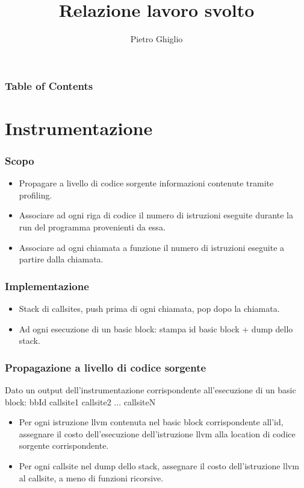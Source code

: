 \documentclass{beamer}
\title{Relazione lavoro svolto}
\author{Pietro Ghiglio}
\begin{document}
\titlepage

\begin{frame}
\frametitle{Table of Contents}
\tableofcontents
\end{frame}


\section{Instrumentazione}
\begin{frame}
\frametitle{Scopo}
\begin{itemize}
\item Propagare a livello di codice sorgente informazioni contenute tramite profiling.
\item Associare ad ogni riga di codice il numero di istruzioni eseguite durante la run del programma provenienti da essa.
\item Associare ad ogni chiamata a funzione il numero di istruzioni eseguite a partire dalla chiamata.
\end{itemize}
\end{frame}

\begin{frame}
\frametitle{Implementazione}
\begin{itemize}
\item Stack di callsites, push prima di ogni chiamata, pop dopo la chiamata.
\item Ad ogni esecuzione di un basic block: stampa id basic block + dump dello stack. 
\end{itemize}
\end{frame}

\begin{frame}
\frametitle{Propagazione a livello di codice sorgente}
Dato un output dell'instrumentazione corrispondente all'esecuzione di un basic block: bbId callsite1 callsite2 ... callsiteN
\begin{itemize}
\item Per ogni istruzione llvm contenuta nel basic block corrispondente all'id, assegnare il costo dell'esecuzione dell'istruzione llvm alla location di codice sorgente corrispondente.
\item Per ogni callsite nel dump dello stack, assegnare il costo dell'istruzione llvm al callsite, a meno di funzioni ricorsive.
\end{itemize}
\end{frame}
\end{document}
